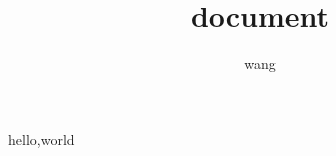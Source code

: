 \documentclass{article}
\author{wang}
\title{document}
\begin{document}
\maketitle
hello,world %
\end{document}

